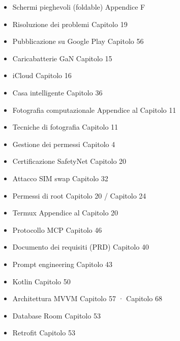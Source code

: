 
\begin{itemize}
  \item Schermi pieghevoli (foldable) Appendice F
  \item Risoluzione dei problemi Capitolo 19
  \item Pubblicazione su Google Play Capitolo 56
  \item Caricabatterie GaN Capitolo 15
  \item iCloud Capitolo 16
  \item Casa intelligente Capitolo 36
  \item Fotografia computazionale Appendice al Capitolo 11
\end{itemize}


\begin{itemize}
  \item Tecniche di fotografia Capitolo 11
  \item Gestione dei permessi Capitolo 4
  \item Certificazione SafetyNet Capitolo 20
  \item Attacco SIM swap Capitolo 32
  \item Permessi di root Capitolo 20 / Capitolo 24
  \item Termux Appendice al Capitolo 20
  \item Protocollo MCP Capitolo 46
  \item Documento dei requisiti (PRD) Capitolo 40
  \item Prompt engineering Capitolo 43
  \item Kotlin Capitolo 50
  \item Architettura MVVM Capitolo 57 · Capitolo 68
  \item Database Room Capitolo 53
  \item Retrofit Capitolo 53
\end{itemize}



